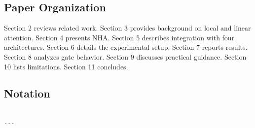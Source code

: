 \subsection{Paper Organization}

Section 2 reviews related work. Section 3 provides background on local and 
linear attention. Section 4 presents NHA. Section 5 describes integration 
with four architectures. Section 6 details the experimental setup. Section 
7 reports results. Section 8 analyzes gate behavior. Section 9 discusses 
practical guidance. Section 10 lists limitations. Section 11 concludes.



\subsection{Notation}

\begin{lstlisting}

---
\end{lstlisting}